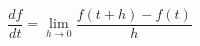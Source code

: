\documentclass[10pt, a5paper]{article}
\begin{document}
$$
\frac{df}{dt} = \lim_{h\rightarrow0} \frac{f(t + h)- f(t)}{h}
$$
\end{document}
